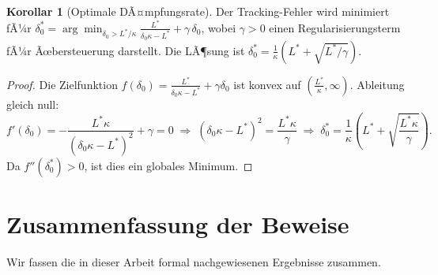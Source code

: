 ﻿\documentclass[a4paper,12pt]{article}
\theoremstyle{definition}
\newtheorem{korollar}{Korollar}
\begin{document}
\begin{korollar}[Optimale DÃ¤mpfungsrate]
\label{kor:deltaOpt}
    Der Tracking-Fehler wird minimiert fÃ¼r
    $\delta_0^* = \arg\min_{\delta_0 > L^*/\kappa}
    \frac{L^*}{\delta_0\kappa - L^*} + \gamma\,\delta_0$,
    wobei $\gamma > 0$ einen Regularisierungsterm fÃ¼r Ãœbersteuerung darstellt.
    Die LÃ¶sung ist $\delta_0^* = \frac{1}{\kappa}\!\left(L^* + \sqrt{L^*/\gamma}\right)$.
\end{korollar}

\begin{proof}
    Die Zielfunktion $f(\delta_0) = \frac{L^*}{\delta_0\kappa - L^*} + \gamma\delta_0$
    ist konvex auf $(\frac{L^*}{\kappa}, \infty)$. Ableitung gleich null:
    \[
        f'(\delta_0) = -\frac{L^*\kappa}{(\delta_0\kappa - L^*)^2} + \gamma = 0
        \;\Rightarrow\;
        (\delta_0\kappa - L^*)^2 = \frac{L^*\kappa}{\gamma}
        \;\Rightarrow\;
        \delta_0^* = \frac{1}{\kappa}\!\left(L^* + \sqrt{\frac{L^*\kappa}{\gamma}}\right).
    \]
    Da $f''(\delta_0^*) > 0$, ist dies ein globales Minimum.
\end{proof}

\section{Zusammenfassung der Beweise}

Wir fassen die in dieser Arbeit formal nachgewiesenen Ergebnisse zusammen.
\end{document}
